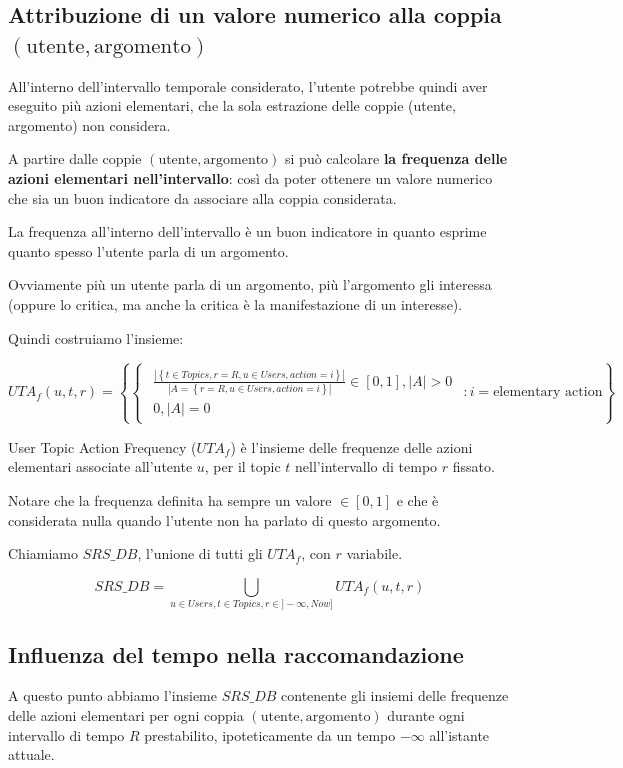 {\clearpage
\subsection{Attribuzione di un valore numerico alla coppia $(\text{utente}, \text{argomento})$}
All'interno dell'intervallo temporale considerato, l'utente potrebbe quindi aver eseguito più azioni elementari, che la sola estrazione delle coppie (utente, argomento) non considera.

A partire dalle coppie $(\text{utente}, \text{argomento})$ si può calcolare \textbf{la frequenza delle azioni elementari nell'intervallo}: così da poter ottenere un valore numerico che sia un buon indicatore da associare alla coppia considerata.

La frequenza all'interno dell'intervallo è un buon indicatore in quanto esprime quanto spesso l'utente parla di un argomento.

Ovviamente più un utente parla di un argomento, più l'argomento gli interessa (oppure lo critica, ma anche la critica è la manifestazione di un interesse).

Quindi costruiamo l'insieme:

$$ UTA_f(u,t,r) = \left\{ \begin{cases}\begin{aligned} \frac {|\left\{t \in Topics, r = R, u \in Users, action = i\right\}|} {|A = \left\{r=R, u \in Users, action=i\right\}|} \in [0,1], |A| > 0\\ 0, |A| = 0 \end{aligned} \end{cases} : i = \text{elementary action} \right\} $$

User Topic Action Frequency ($UTA_f$) è l'insieme delle frequenze delle azioni elementari associate all'utente $u$, per il topic $t$ nell'intervallo di tempo $r$ fissato.

Notare che la frequenza definita ha sempre un valore $\in [0,1]$ e che è considerata nulla quando l'utente non ha parlato di questo argomento.

Chiamiamo $SRS\_DB$, l'unione di tutti gli $UTA_f$, con $r$ variabile.

$$ SRS\_DB = \bigcup\limits_{u \in Users, t \in Topics, r \in ]-\infty, Now]}{UTA_f(u,t,r)} $$

\subsection{Influenza del tempo nella raccomandazione}
A questo punto abbiamo l'insieme $SRS\_DB$ contenente gli insiemi delle frequenze delle azioni elementari per ogni coppia $(\text{utente}, \text{argomento})$ durante ogni intervallo di tempo $R$ prestabilito, ipoteticamente da un tempo $-\infty$ all'istante attuale. 

}
